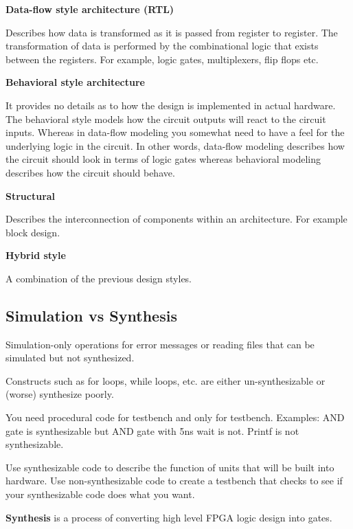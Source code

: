 \textbf{Data-flow style architecture (RTL)}

Describes how data is transformed as it is passed from register to register.
The transformation of data is performed by the combinational logic
that exists between the registers. For example, logic gates, multiplexers,
flip flops etc.


\textbf{Behavioral style architecture}

It provides no details as to how the design is implemented in actual hardware.
The behavioral style models how the circuit outputs will react to the circuit inputs.
Whereas in data-flow modeling you somewhat need to have a feel for the underlying logic in the circuit.
In other words, data-flow modeling describes how the circuit should look in terms of logic gates
whereas behavioral modeling describes how the circuit should behave.

\textbf{Structural}

Describes the interconnection of components within an architecture.
For example block design.

\textbf{Hybrid style}

A combination of the previous design styles.


\subsection{Simulation vs Synthesis}

Simulation-only operations for error messages or reading files that
can be simulated but not synthesized.

Constructs such as for loops, while loops, etc. are either
un-synthesizable or (worse) synthesize poorly.

You need procedural code for testbench and only for testbench.
Examples: AND gate is synthesizable but AND gate with 5ns wait is not.
Printf is not synthesizable.

Use synthesizable code to describe the function of units that will be
built into hardware. Use non-synthesizable code to create a testbench
that checks to see if your synthesizable code does what you want.

\textbf{Synthesis} is a process of converting high level
FPGA logic design into gates.


